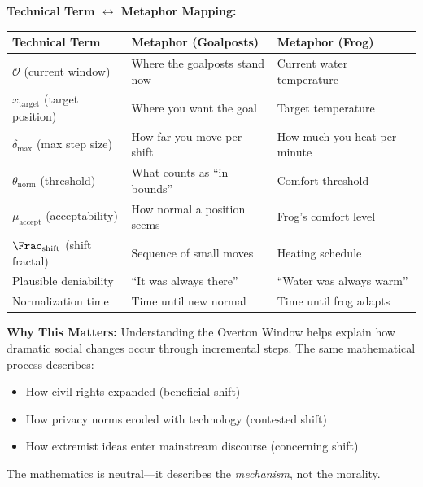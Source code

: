 \begin{tcolorbox}[colback=green!5!white,colframe=green!65!black,title=\textbf{Plain English: What is the Overton Window?},breakable]
\textbf{Technical Term $\leftrightarrow$ Metaphor Mapping:}
\begin{center}
\footnotesize
\begin{tabularx}{\textwidth}{>{\raggedright\arraybackslash}X|>{\raggedright\arraybackslash}X|>{\raggedright\arraybackslash}X}
\toprule
\textbf{Technical Term} & \textbf{Metaphor (Goalposts)} & \textbf{Metaphor (Frog)} \\
\midrule
$\mathcal{O}$ (current window) & Where the goalposts stand now & Current water temperature \\
$x_{\mathrm{target}}$ (target position) & Where you want the goal & Target temperature \\
$\delta_{\max}$ (max step size) & How far you move per shift & How much you heat per minute \\
$\theta_{\mathrm{norm}}$ (threshold) & What counts as ``in bounds'' & Comfort threshold \\
$\mu_{\mathrm{accept}}$ (acceptability) & How normal a position seems & Frog's comfort level \\
$\Frac_{\mathrm{shift}}$ (shift fractal) & Sequence of small moves & Heating schedule \\
Plausible deniability & ``It was always there'' & ``Water was always warm'' \\
Normalization time & Time until new normal & Time until frog adapts \\
\bottomrule
\end{tabularx}
\end{center}

\textbf{Why This Matters:}
Understanding the Overton Window helps explain how dramatic social changes occur
through incremental steps. The same mathematical process describes:
\begin{itemize}
    \item How civil rights expanded (beneficial shift)
    \item How privacy norms eroded with technology (contested shift)
    \item How extremist ideas enter mainstream discourse (concerning shift)
\end{itemize}
The mathematics is neutral---it describes the \textit{mechanism}, not the morality.

\end{tcolorbox}

